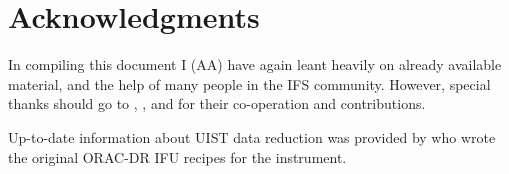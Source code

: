 \documentclass[twoside,11pt]{starlink}
\begin{document}
\section*{Acknowledgments\label{sc16_acks}}

In compiling this document I (AA) have again leant heavily on already
available material, and the help of many people in the IFS community.
However, special thanks should go to , ,
 and
 for their
co-operation and contributions.

Up-to-date information about UIST data reduction was provided by
 who
wrote the original ORAC-DR IFU recipes for the instrument.
\end{document}
